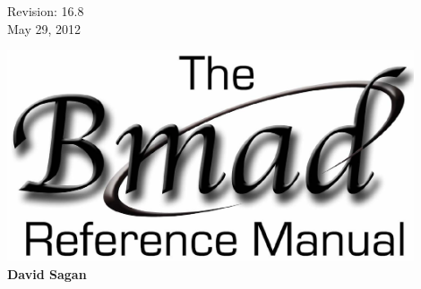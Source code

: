 \thispagestyle{empty}

\begin{flushright}
\large
  Revision: 16.8 \\
  May 29, 2012 \\
\end{flushright}

\vfill

{
\begin{center}
\includegraphics[width=12cm]{bmad-ref-manual.pdf} \\
\vskip 0.3in
\huge\bf David Sagan
\end{center}
}

\vfill
\break


